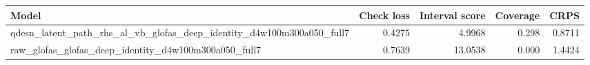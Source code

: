 \begin{tabular}{lrrrr}
\toprule
Model & Check loss & Interval score & Coverage & CRPS \\
\midrule
qdesn_latent_path_rhs_al_vb_glofas_deep_identity_d4w100m300a050_full7 & 0.4275 & 4.9968 & 0.298 & 0.8711 \\
raw_glofas_glofas_deep_identity_d4w100m300a050_full7 & 0.7639 & 13.0538 & 0.000 & 1.4424 \\
\bottomrule
\end{tabular}
